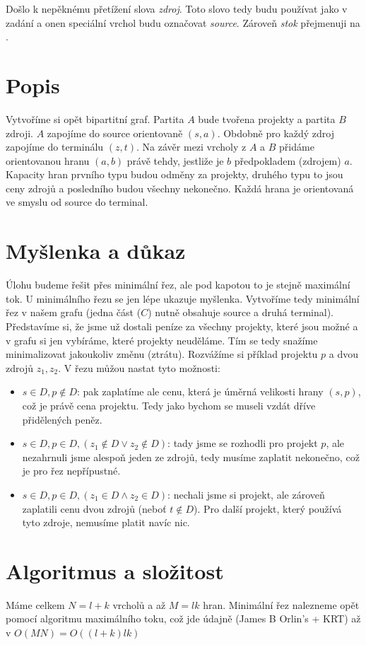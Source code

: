 \documentclass[a4paper]{article}
\begin{document}
\renewcommand{\headrulewidth}{0pt} %
\thispagestyle{fancy} %
{}

Došlo k nepěknému přetížení slova \textit{zdroj}. Toto slovo tedy budu používat jako v zadání a onen speciální vrchol budu označovat \textit{source}. Zároveň \textit{stok} přejmenuji na .

\section*{Popis}
Vytvoříme si opět bipartitní graf. Partita $A$ bude tvořena projekty a partita $B$ zdroji. $A$ zapojíme do source orientovaně $(s, a)$. Obdobně pro každý zdroj zapojíme do terminálu $(z,t)$. Na závěr mezi vrcholy z $A$ a $B$ přidáme orientovanou hranu $(a,b)$ právě tehdy, jestliže je $b$ předpokladem (zdrojem) $a$. Kapacity hran prvního typu budou odměny za projekty, druhého typu to jsou ceny zdrojů a posledního budou všechny nekonečno. Každá hrana je orientovaná ve smyslu od source do terminal.

\section*{Myšlenka a důkaz}
Úlohu budeme řešit přes minimální řez, ale pod kapotou to je stejně maximální tok. U minimálního řezu se jen lépe ukazuje myšlenka. Vytvoříme tedy minimální řez v našem grafu (jedna část ($C$) nutně obsahuje source a druhá terminal). Představíme si, že jsme už dostali peníze za všechny projekty, které jsou možné a v grafu si jen vybíráme, které projekty neuděláme. Tím se tedy snažíme minimalizovat jakoukoliv změnu (ztrátu). Rozvážíme si příklad projektu $p$ a dvou zdrojů $z_1, z_2$. V řezu můžou nastat tyto možnosti:
\begin{itemize}
\item $s \in D, p \notin D$: pak zaplatíme ale cenu, která je úměrná velikosti hrany $(s,p)$, což je právě cena projektu. Tedy jako bychom se museli vzdát dříve přidělených peněz. \\
\item $s \in D, p \in D, (z_1 \notin D \vee z_2 \notin D)$: tady jsme se rozhodli pro projekt $p$, ale nezahrnuli jsme alespoň jeden ze zdrojů, tedy musíme zaplatit nekonečno, což je pro řez nepřípustné.
\item $s \in D, p \in D, (z_1 \in D \wedge z_2 \in D)$: nechali jsme si projekt, ale zároveň zaplatili cenu dvou zdrojů (neboť $t \notin D$). Pro další projekt, který používá tyto zdroje, nemusíme platit navíc nic.
\end{itemize}

\section*{Algoritmus a složitost}
Máme celkem $N = l+k$ vrcholů a až $M=lk$ hran. Minimální řez nalezneme opět pomocí algoritmu maximálního toku, což jde údajně (James B Orlin's + KRT) až v $O(MN) = O((l+k)lk)$
\end{document}
